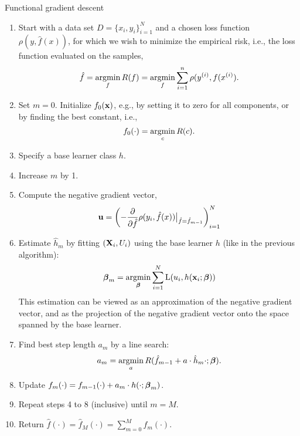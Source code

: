 \begin{algorithm}
\caption{Functional gradient descent}
\label{algo:fgd}
\begin{enumerate}
    \item Start with a data set $D=\{x_i, y_i\}_{i=1}^N$ and a chosen loss function $\rho(y,\hat{f}(x))$, for which we wish to
        minimize the empirical risk, i.e., the loss function evaluated on the samples,
        \begin{equation}
            \hat{f}=\operatorname*{argmin}_{f}R(f)=\operatorname*{argmin}_{f}\sum_{i=1}^n\rho(y^{(i)},f(x^{(i)}).
        \end{equation}
    \item Set $m=0$. Initialize $f_0(\mathbf{x})$, e.g., by setting it to zero for all components, or by finding the best constant, i.e.,
        \begin{equation}
            f_0(\cdot)=\operatorname*{argmin}_c R(c).
        \end{equation}
    \item Specify a base learner class $h$.
    \item Increase $m$ by 1.
    \item Compute the negative gradient vector,
        \begin{equation}
            \mathbf{u}=\left(-\frac{\partial}{\partial \hat{f}}\rho(y_i, \hat{f}(x))\big\rvert_{\hat{f}=\hat{f}_{m-1}}\right)_{i=1}^N
        \end{equation}
    \item Estimate $\hat{h}_m$ by fitting $(\mathbf{X}_i,U_i)$ using the base learner $h$ (like in the previous algorithm):
        \begin{equation*}
            \boldsymbol{\beta}_m=\operatorname*{argmin}_{\boldsymbol{\beta}}\sum_{i=1}^N\operatorname{L}(u_i,h(\mathbf{x}_i;\boldsymbol{\beta}))
        \end{equation*}
        This estimation can be viewed as an approximation of the negative gradient vector, and as the projection of the negative gradient vector onto the space spanned by the base learner.
    \item Find best step length $a_m$ by a line search:
        \begin{equation*}
            a_m=\operatorname*{argmin}_{a}R(\hat{f}_{m-1}+a\cdot\hat{h}_m{\cdot;\boldsymbol{\beta}}).
        \end{equation*}
    \item Update $f_m(\cdot)=f_{m-1}(\cdot)+a_m\cdot h(\cdot;\boldsymbol{\beta}_m)$.
    \item Repeat steps 4 to 8 (inclusive) until $m=M$.
    \item Return $\hat{f}(\cdot)=\hat{f}_M(\cdot)=\sum_{m=0}^Mf_m(\cdot)$.
\end{enumerate}
\end{algorithm}
